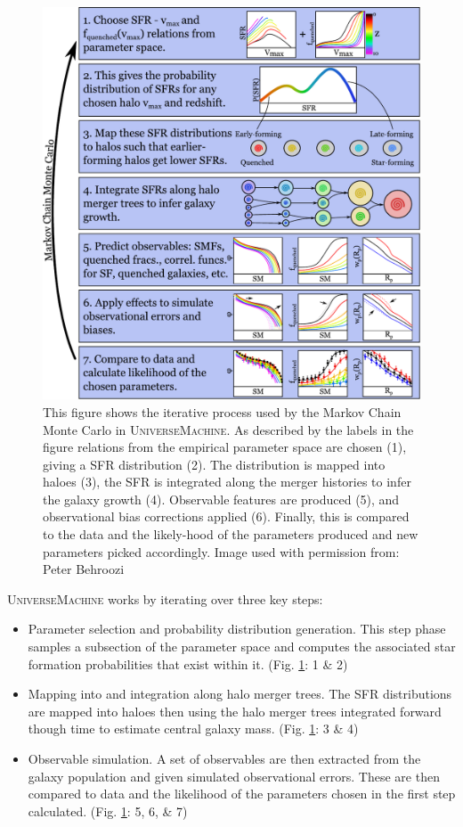 \begin{figure}[h]
    \centering
    \includegraphics[width = \linewidth]{Figures/Chapter1/sfr_method.pdf}
    \caption{
    This figure shows the iterative process used by the Markov Chain Monte Carlo in U\textsc{niverse}M\textsc{achine}. As described by the labels in the figure relations from the empirical parameter space are chosen (1), giving a SFR distribution (2). The distribution is mapped into haloes (3), the SFR is integrated along the merger histories to infer the galaxy growth (4). Observable features are produced (5), and observational bias corrections applied (6). Finally, this is compared to the data and the likely-hood of the parameters produced and new parameters picked accordingly.
    Image used with permission from: Peter Behroozi \cite{Behroozi2019UniverseMachine:010}}
    \label{fig:BehMeth}
\end{figure}

U\textsc{niverse}M\textsc{achine} works by iterating over three key steps:
\begin{itemize}
    \item Parameter selection and probability distribution generation. This step phase samples a subsection of the parameter space and computes the associated star formation probabilities that exist within it. (Fig. \ref{fig:BehMeth}: 1 \& 2)
    \item Mapping into and integration along halo merger trees. The SFR distributions are mapped into haloes then using the halo merger trees integrated forward though time to estimate central galaxy mass. (Fig. \ref{fig:BehMeth}: 3 \& 4)
    \item Observable simulation. A set of observables are then extracted from the galaxy population and given simulated observational errors. These are then compared to data and the likelihood of the parameters chosen in the first step calculated. (Fig. \ref{fig:BehMeth}: 5, 6, \& 7)
\end{itemize}


